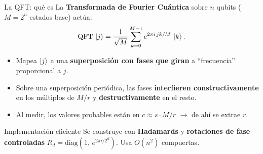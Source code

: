 \documentclass[aspectratio=169]{beamer}
\begin{document}
\begin{frame}{La QFT: qué es}
  La \textbf{Transformada de Fourier Cuántica} sobre $n$ qubits
  ($M=2^n$ estados base) actúa:
  \[
    \mathrm{QFT}\,\ket{j}
    = \frac{1}{\sqrt{M}}\sum_{k=0}^{M-1}
      e^{2\pi i\,jk/M}\,\ket{k}.
  \]
  \begin{itemize}
    \item Mapea $\ket{j}$ a una \textbf{superposición con fases que giran}
          a ``frecuencia'' proporcional a $j$.
    \item Sobre una superposición periódica, las fases \textbf{interfieren
          constructivamente} en los múltiplos de $M/r$ y
          \textbf{destructivamente} en el resto.
    \item Al medir, los valores probables están en $c\approx s\cdot M/r$
          $\to$ de ahí se extrae $r$.
  \end{itemize}

  \begin{block}{Implementación eficiente}
    \small Se construye con \textbf{Hadamards} y \textbf{rotaciones de fase
    controladas} $R_d = \mathrm{diag}(1,\,e^{2\pi i/2^d})$.
    Usa $O(n^2)$ compuertas.
  \end{block}

\end{frame}
\end{document}
